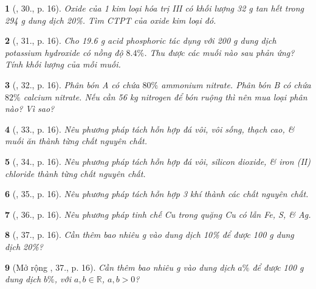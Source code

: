 \documentclass{article}
\newtheorem{baitoan}{}
\begin{document}
\begin{baitoan}[\cite{An_400_BT_Hoa_Hoc_9}, 30., p. 16]
	Oxide của 1 kim loại hóa trị {\rm III} có khối lượng {\rm32 g} tan hết trong {\rm294 g} dung dịch {\rm{} 20\%}. Tìm {\rm CTPT} của oxide kim loại đó.
\end{baitoan}

\begin{baitoan}[\cite{An_400_BT_Hoa_Hoc_9}, 31., p. 16]
	Cho {\rm19.6 g} acid phosphoric tác dụng với {\rm200 g} dung dịch potassium hydroxide có nồng độ $8.4\%$. Thu được các muối nào sau phản ứng? Tính khối lượng của mỗi muối.
\end{baitoan}

\begin{baitoan}[\cite{An_400_BT_Hoa_Hoc_9}, 32., p. 16]
	Phân bón A có chứa $80\%$ ammonium nitrate. Phân bón B có chứa $82\%$ calcium nitrate. Nếu cần {\rm56 kg} nitrogen để bón ruộng thì nên mua loại phân nào? Vì sao?
\end{baitoan}

\begin{baitoan}[\cite{An_400_BT_Hoa_Hoc_9}, 33., p. 16]
	Nêu phương pháp tách hỗn hợp đá vôi, vôi sống, thạch cao, \& muối ăn thành từng chất nguyên chất.
\end{baitoan}

\begin{baitoan}[\cite{An_400_BT_Hoa_Hoc_9}, 34., p. 16]
	Nêu phương pháp tách hỗn hợp đá vôi, silicon dioxide, \& iron ({\rm II}) chloride thành từng chất nguyên chất.
\end{baitoan}

\begin{baitoan}[\cite{An_400_BT_Hoa_Hoc_9}, 35., p. 16]
	Nêu phương pháp tách hỗn hợp 3 khí {\rm{}} thành các chất nguyên chất.
\end{baitoan}

\begin{baitoan}[\cite{An_400_BT_Hoa_Hoc_9}, 36., p. 16]
	Nêu phương pháp tinh chế {\rm Cu} trong quặng {\rm Cu} có lẫn {\rm Fe, S}, \& {\rm Ag}.
\end{baitoan}

\begin{baitoan}[\cite{An_400_BT_Hoa_Hoc_9}, 37., p. 16]
	Cần thêm bao nhiêu {\rm g } vào dung dịch {\rm{} 10\%} để được {\rm100 g} dung dịch {\rm{} 20\%}?
\end{baitoan}

\begin{baitoan}[Mở rộng \cite{An_400_BT_Hoa_Hoc_9}, 37., p. 16]
	Cần thêm bao nhiêu {\rm g } vào dung dịch {\rm{} $a\%$} để được {\rm100 g} dung dịch {\rm{} $b\%$}, với $a,b\in\mathbb{R}$, $a,b > 0$?
\end{baitoan}
\end{document}
